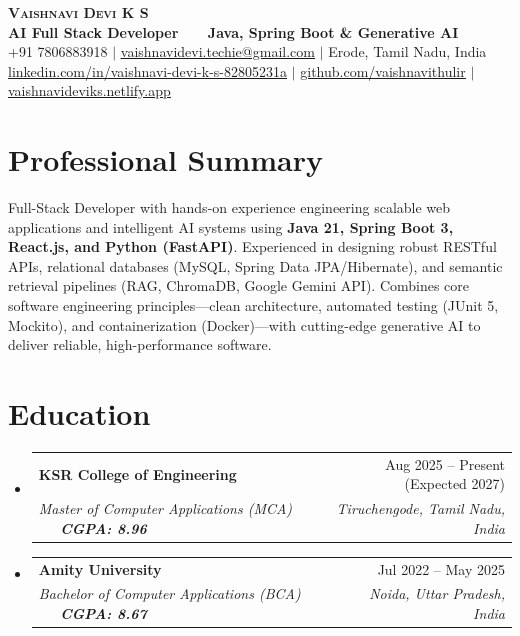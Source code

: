 \documentclass[letterpaper,10pt]{article}
\makeatletter
\newcommand{\resumeSubheading}[4]{
  \vspace{-2pt}\item
    \begin{tabular*}{0.98\textwidth}[t]{l@{\extracolsep{\fill}}r}
      \textbf{#1} & #2 \\
      \textit{\small#3} & \textit{\small #4} \\
    \end{tabular*}\vspace{-4pt}
}
\newcommand{\resumeSubHeadingListStart}{\begin{itemize}[leftmargin=0.15in, label={}]}
\newcommand{\resumeSubHeadingListEnd}{\end{itemize}}
\makeatother
\begin{document}
\begin{center}
    \textbf{\Huge \scshape Vaishnavi Devi K S} \\ \vspace{2pt}
    \textbf{\large AI Full Stack Developer \ \textbar \ \ Java, Spring Boot \& Generative AI} \\ \vspace{2pt}
    \small +91 7806883918 $|$ \href{mailto:vaishnavidevi.techie@gmail.com}{\underline{vaishnavidevi.techie@gmail.com}} $|$ Erode, Tamil Nadu, India \\ \vspace{1pt}
    \href{https://linkedin.com/in/vaishnavi-devi-k-s-82805231a}{\underline{linkedin.com/in/vaishnavi-devi-k-s-82805231a}} $|$ 
    \href{https://github.com/vaishnavithulir}{\underline{github.com/vaishnavithulir}} $|$ 
    \href{https://vaishnavideviks.netlify.app/}{\underline{vaishnavideviks.netlify.app}}
\end{center}

\section{Professional Summary}
\small{
Full-Stack Developer with hands-on experience engineering scalable web applications and intelligent AI systems using \textbf{Java 21, Spring Boot 3, React.js, and Python (FastAPI)}. Experienced in designing robust RESTful APIs, relational databases (MySQL, Spring Data JPA/Hibernate), and semantic retrieval pipelines (RAG, ChromaDB, Google Gemini API). Combines core software engineering principles—clean architecture, automated testing (JUnit 5, Mockito), and containerization (Docker)—with cutting-edge generative AI to deliver reliable, high-performance software.
}

\section{Education}
  \resumeSubHeadingListStart
    \resumeSubheading
      {KSR College of Engineering}{Aug 2025 -- Present (Expected 2027)}
      {Master of Computer Applications (MCA) \ \textbar \ \ \textbf{CGPA: 8.96}}{Tiruchengode, Tamil Nadu, India}
    \resumeSubheading
      {Amity University}{Jul 2022 -- May 2025}
      {Bachelor of Computer Applications (BCA) \ \textbar \ \ \textbf{CGPA: 8.67}}{Noida, Uttar Pradesh, India}
  \resumeSubHeadingListEnd
\end{document}

